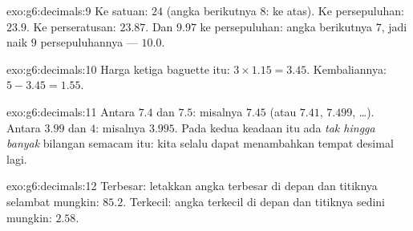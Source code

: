 \begin{solution}{exo:g6:decimals:9}
Ke satuan: $24$ (angka berikutnya $8$:  ke atas). Ke
persepuluhan: $23.9$. Ke perseratusan: $23.87$. Dan $9.97$ ke
persepuluhan: angka berikutnya $7$, jadi  naik $9$ persepuluhannya --- $10.0$.
\end{solution}

\begin{solution}{exo:g6:decimals:10}
Harga ketiga baguette itu: $3 \times 1.15 = 3.45$. Kembaliannya:
$5 - 3.45 = 1.55$.
\end{solution}

\begin{solution}{exo:g6:decimals:11}
Antara $7.4$ dan $7.5$: misalnya $7.45$ (atau $7.41$, $7.499$,
\dots). Antara $3.99$ dan $4$: misalnya $3.995$. Pada kedua keadaan
itu ada \emph{tak hingga banyak} bilangan semacam itu: kita selalu
dapat menambahkan tempat desimal lagi.
\end{solution}

\begin{solution}{exo:g6:decimals:12}
Terbesar: letakkan angka terbesar di depan dan titiknya selambat
mungkin: $85.2$. Terkecil: angka terkecil di depan dan titiknya
sedini mungkin: $2.58$.
\end{solution}

